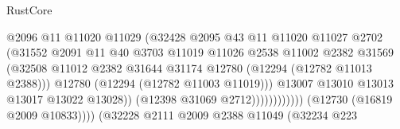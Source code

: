 \begin{lexlean}{RustCore}
\begin{coremodule}
                                                  @2096
                                                  @11
                                                  @11020
                                                  @11029
                                                  (@32428
                                                    @2095
                                                    @43
                                                    @11
                                                    @11020
                                                    @11027
                                                    @2702
                                                    (@31552
                                                      @2091
                                                      @11
                                                      @40
                                                      @3703
                                                      @11019
                                                      @11026
                                                      @2538
                                                      @11002
                                                      @2382
                                                      @31569
                                                      (@32508
                                                        @11012
                                                        @2382
                                                        @31644
                                                        @31174
                                                        @12780
                                                        (@12294 (@12782 @11013 @2388)))
                                                      @12780
                                                      (@12294 (@12782 @11003 @11019)))
                                                    @13007
                                                    @13010
                                                    @13013
                                                    @13017
                                                    @13022
                                                    @13028))
                                                (@12398 @31069 @2712))))))))))))
                          (@12730 (@16819 @2009 @10833))))
                      (@32228
                        @2111
                        @2009
                        @2388
                        @11049
                        (@32234
                          @223

\end{coremodule}
\end{lexlean}
